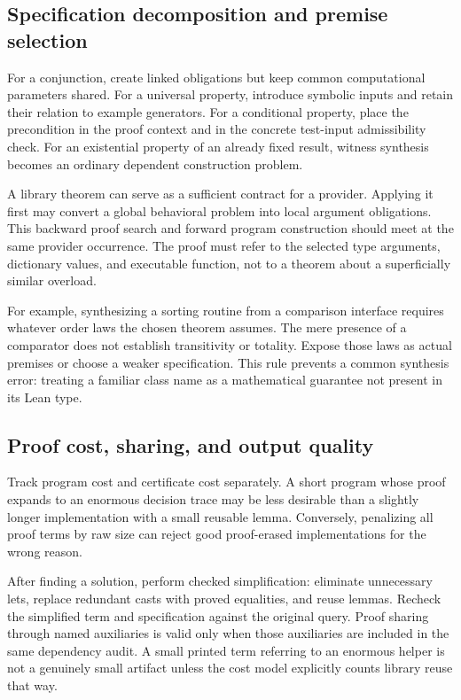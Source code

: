 \subsection{Specification decomposition and premise selection}
For a conjunction, create linked obligations but keep common computational parameters shared. For a universal property, introduce symbolic inputs and retain their relation to example generators. For a conditional property, place the precondition in the proof context and in the concrete test-input admissibility check. For an existential property of an already fixed result, witness synthesis becomes an ordinary dependent construction problem.

A library theorem can serve as a sufficient contract for a provider. Applying it first may convert a global behavioral problem into local argument obligations. This backward proof search and forward program construction should meet at the same provider occurrence. The proof must refer to the selected type arguments, dictionary values, and executable function, not to a theorem about a superficially similar overload.

For example, synthesizing a sorting routine from a comparison interface requires whatever order laws the chosen theorem assumes. The mere presence of a comparator does not establish transitivity or totality. Expose those laws as actual premises or choose a weaker specification. This rule prevents a common synthesis error: treating a familiar class name as a mathematical guarantee not present in its Lean type.

\subsection{Proof cost, sharing, and output quality}
Track program cost and certificate cost separately. A short program whose proof expands to an enormous decision trace may be less desirable than a slightly longer implementation with a small reusable lemma. Conversely, penalizing all proof terms by raw size can reject good proof-erased implementations for the wrong reason.

After finding a solution, perform checked simplification: eliminate unnecessary lets, replace redundant casts with proved equalities, and reuse lemmas. Recheck the simplified term and specification against the original query. Proof sharing through named auxiliaries is valid only when those auxiliaries are included in the same dependency audit. A small printed term referring to an enormous helper is not a genuinely small artifact unless the cost model explicitly counts library reuse that way.
